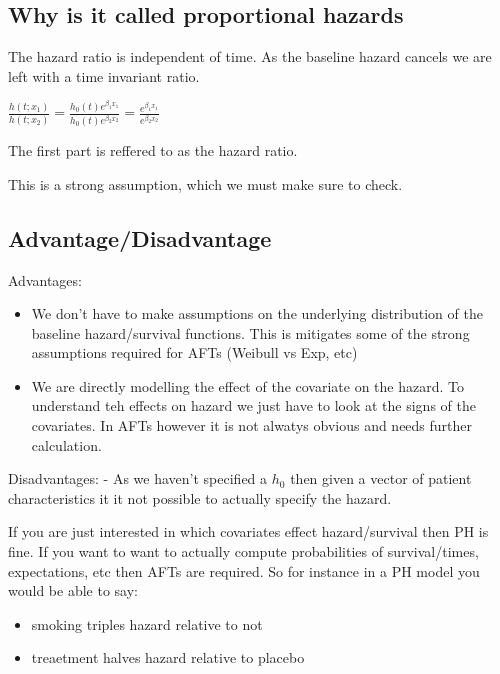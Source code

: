 \documentclass[
  letterpaper,
  DIV=11,
  numbers=noendperiod]{scrreprt}
\providecommand{\tightlist}{%
  \setlength{\itemsep}{0pt}\setlength{\parskip}{0pt}}\usepackage{longtable,booktabs,array}
\begin{document}
\hypertarget{why-is-it-called-proportional-hazards}{%
\subsection{Why is it called proportional
hazards}\label{why-is-it-called-proportional-hazards}}

The hazard ratio is independent of time. As the baseline hazard cancels
we are left with a time invariant ratio.

\(\frac{h(t;x_1)}{h(t;x_2)} = \frac{h_0(t)e^{\beta_1 x_1}}{h_0(t)e^{\beta_2 x_2}} = \frac{e^{\beta_1 x_1}}{e^{\beta_2 x_2}}\)

The first part is reffered to as the hazard ratio.

This is a strong assumption, which we must make sure to check.

\hypertarget{advantagedisadvantage}{%
\subsection{Advantage/Disadvantage}\label{advantagedisadvantage}}

Advantages:

\begin{itemize}
\tightlist
\item
  We don't have to make assumptions on the underlying distribution of
  the baseline hazard/survival functions. This is mitigates some of the
  strong assumptions required for AFTs (Weibull vs Exp, etc)
\item
  We are directly modelling the effect of the covariate on the hazard.
  To understand teh effects on hazard we just have to look at the signs
  of the covariates. In AFTs however it is not alwatys obvious and needs
  further calculation.
\end{itemize}

Disadvantages: - As we haven't specified a \(h_0\) then given a vector
of patient characteristics it it not possible to actually specify the
hazard.

If you are just interested in which covariates effect hazard/survival
then PH is fine. If you want to want to actually compute probabilities
of survival/times, expectations, etc then AFTs are required. So for
instance in a PH model you would be able to say:

\begin{itemize}
\tightlist
\item
  smoking triples hazard relative to not
\item
  treaetment halves hazard relative to placebo
\end{itemize}
\end{document}
